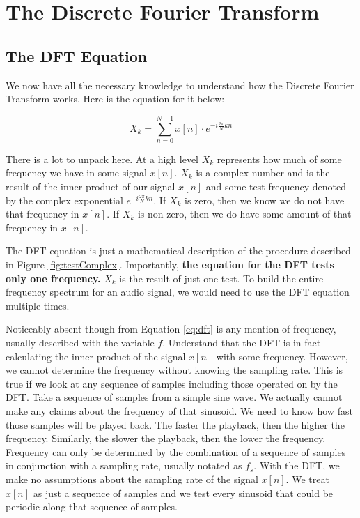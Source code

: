 \section*{The Discrete Fourier Transform}

\subsection*{The DFT Equation}

We now have all the necessary knowledge to understand how the Discrete Fourier Transform works.  Here is the
equation for it below:

\begin{equation}
\label{eq:dft}
X_k = \sum_{n = 0}^{N - 1}x[n] \cdot e^{-i\frac{2\pi}{N}kn}
\end{equation}

There is a lot to unpack here.  At a high level $X_k$ represents how much of some frequency we have in
some signal $x[n]$.  $X_k$ is a complex number and is the result of the inner product of our signal $x[n]$
and some test frequency denoted by the complex exponential $e^{-i\frac{2\pi}{N}kn}$.  If $X_k$ is zero, then
we know we do not have that frequency in $x[n]$.  If $X_k$ is non-zero, then we do have some amount of 
that frequency in $x[n]$.  

The DFT equation is just a mathematical description of the procedure described 
in Figure \ref{fig:testComplex}.  Importantly, \textbf{the equation for the DFT tests only one frequency.}  
$X_k$ is the result of just one test.  To build the entire frequency spectrum for an audio signal, we would
need to use the DFT equation multiple times.

Noticeably absent though from Equation \ref{eq:dft} is any mention of frequency, usually described with the
variable $f$.  Understand that the DFT is in fact calculating the inner product of the signal $x[n]$ with some
 frequency.  However, we cannot determine the frequency without knowing the sampling rate.  This is
 true if we look at any sequence of samples including those operated on by the DFT.
Take a sequence of samples from a simple sine wave.  We actually cannot make any
claims about the frequency of that sinusoid.  We need to know how fast those samples will be played back.  
 The faster the playback, then the higher the frequency.  Similarly, the slower the playback, then the lower
 the frequency.  Frequency can only be determined by the combination 
 of a sequence of samples in conjunction with a sampling rate, usually notated as $f_s$.  With the DFT, we
 make no assumptions about the sampling rate of the signal $x[n]$.  We treat $x[n]$ as just a sequence of
 samples and we test every sinusoid that could be periodic along that sequence of samples.

